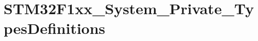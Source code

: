\hypertarget{group___s_t_m32_f1xx___system___private___types_definitions}{}\section{S\+T\+M32\+F1xx\+\_\+\+System\+\_\+\+Private\+\_\+\+Types\+Definitions}
\label{group___s_t_m32_f1xx___system___private___types_definitions}
